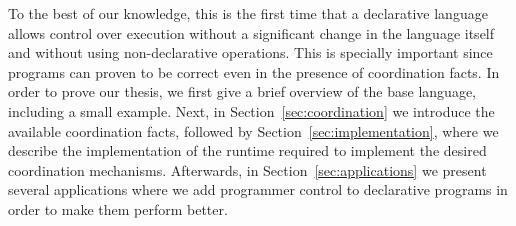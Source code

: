 To the best of our knowledge, this is the first time that a declarative language allows 
control over execution without a significant change in the language itself and
without using non-declarative operations. This is specially important since
programs can proven to be correct even in the presence of coordination facts.
In order to prove our thesis, we first give a brief overview of the
base language, including a small example. Next, in
Section~\ref{sec:coordination} we introduce the available coordination facts,
followed by Section~\ref{sec:implementation}, where we describe the
implementation of the runtime required to implement the desired coordination
mechanisms. Afterwards, in Section~\ref{sec:applications} we present several applications where we add
programmer control to declarative programs in order to make them perform better.
